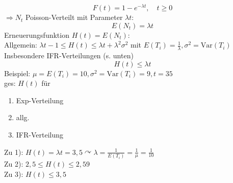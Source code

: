 \documentclass[a4paper]{scrartcl}
\begin{document}
\[F(t) = 1- e^{-\lambda t}, \quad t \geq 0\]
$\Rightarrow N_t$ Poisson-Verteilt mit Parameter $\lambda t$:
\[ E(N_t) = \lambda t\]
Erneuerungsfunktion $H(t) = E(N_t):$\\
Allgemein: $\lambda t - 1 \leq H(t) \leq \lambda t + \lambda^2 \sigma^2$ mit $E(T_i) = \frac{1}{\lambda} , \sigma^2 = \text{Var}(T_i)$
Insbesondere \textsc{IFR}-Verteilungen (s. unten)
\[ H(t) \leq \lambda t \]
Beispiel: $\mu = E(T_i) = 10, \sigma^2  = \text{Var}(T_i) = 9, t = 35$\\
ges: $H(t)$ für
\begin{enumerate}
\item Exp-Verteilung
\item allg.
\item IFR-Verteilung
\end{enumerate}
Zu 1): $H(t) = \lambda t = 3,5 \curvearrowright \lambda = \frac{1}{E(T_i)} = \frac{1}{\mu} = \frac{1}{10}$\\
Zu 2): $2,5 \leq H(t) \leq 2,59$\\
Zu 3):  $H(t) \leq 3,5$
\end{document}
